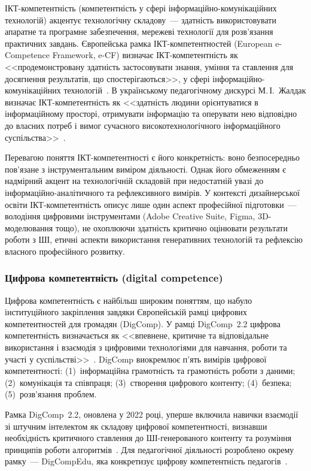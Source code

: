 ІКТ-компетентність (компетентність у сфері інформаційно-комунікаційних технологій) акцентує технологічну складову~--- здатність використовувати апаратне та програмне забезпечення, мережеві технології для розв'язання практичних завдань. Європейська рамка ІКТ-компетентностей (European e-Competence Framework, e-CF) визначає ІКТ-компетентність як <<продемонстровану здатність застосовувати знання, уміння та ставлення для досягнення результатів, що спостерігаються>>, у сфері інформаційно-комунікаційних технологій~\cite{CEN2014eCF}. В українському педагогічному дискурсі М.\,І.~Жалдак визначає ІКТ-компетентність як <<здатність людини орієнтуватися в інформаційному просторі, отримувати інформацію та оперувати нею відповідно до власних потреб і вимог сучасного високотехнологічного інформаційного суспільства>>~\cite{Zhaldak2005Competency}.

Перевагою поняття ІКТ-компетентності є його конкретність: воно безпосередньо пов'язане з інструментальним виміром діяльності. Однак його обмеженням є надмірний акцент на технологічній складовій при недостатній увазі до інформаційно-аналітичного та рефлексивного вимірів. У контексті дизайнерської освіти ІКТ-компетентність описує лише один аспект професійної підготовки~--- володіння цифровими інструментами (Adobe Creative Suite, Figma, 3D-моделювання тощо), не охоплюючи здатність критично оцінювати результати роботи з ШІ, етичні аспекти використання генеративних технологій та рефлексію власного професійного розвитку.

\subsubsection{Цифрова компетентність (digital competence)}\label{sssec:1.1.3}

Цифрова компетентність є найбільш широким поняттям, що набуло інституційного закріплення завдяки Європейській рамці цифрових компетентностей для громадян (DigComp). У рамці DigComp~2.2 цифрова компетентність визначається як <<впевнене, критичне та відповідальне використання і взаємодія з цифровими технологіями для навчання, роботи та участі у суспільстві>>~\cite{Vuorikari2022DigComp}. DigComp виокремлює п'ять вимірів цифрової компетентності: (1)~інформаційна грамотність та грамотність роботи з даними; (2)~комунікація та співпраця; (3)~створення цифрового контенту; (4)~безпека; (5)~розв'язання проблем.

Рамка DigComp~2.2, оновлена у 2022 році, уперше включила навички взаємодії зі штучним інтелектом як складову цифрової компетентності, визнавши необхідність критичного ставлення до ШІ-генерованого контенту та розуміння принципів роботи алгоритмів~\cite{Vuorikari2022DigComp}. Для педагогічної діяльності розроблено окрему рамку~--- DigCompEdu, яка конкретизує цифрову компетентність педагогів~\cite{Redecker2017DigCompEdu}.

